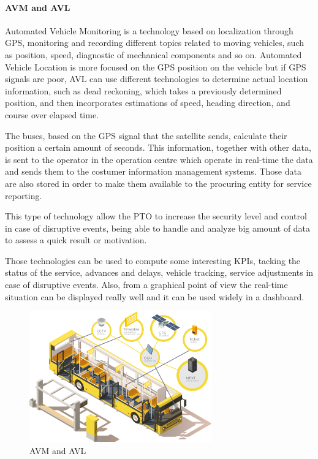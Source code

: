 \paragraph{AVM and AVL}
Automated Vehicle Monitoring is a technology based on localization through GPS, monitoring and recording different topics related to moving vehicles, such as position, speed, diagnostic of mechanical components and so on. Automated Vehicle Location is more focused on the GPS position on the vehicle but if GPS signals are poor, AVL can use different technologies to determine actual location information, such as dead reckoning, which takes a previously determined position, and then incorporates estimations of speed, heading direction, and course over elapsed time. 

The buses, based on the GPS signal that the satellite sends, calculate their position a certain amount of seconds. This information, together with other data, is sent to the operator in the operation centre which operate in real-time the data and sends them to the costumer information management systems. Those data are also stored in order to make them available to the procuring entity for service reporting.

This type of technology allow the PTO to increase the security level and control in case of disruptive events, being able to handle and analyze big amount of data to assess a quick result or motivation.

Those technologies can be used to compute some interesting KPIs, tacking the status of the service, advances and delays, vehicle tracking, service adjustments in case of disruptive events. Also, from a graphical point of view the real-time situation can be displayed really well and it can be used widely in a dashboard.
\begin{figure}[H]
    \centering
    \includegraphics[width=0.7\textwidth]{Images/New Technologies/AVMeAVL.jpg}
    \caption{AVM and AVL}
    \label{fig:avmavl}
\end{figure}

